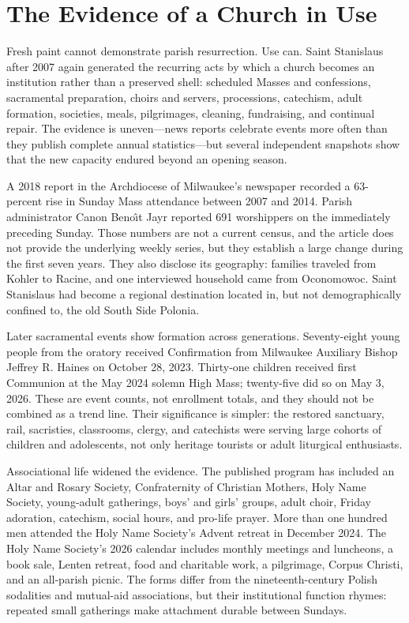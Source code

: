\section{The Evidence of a Church in Use}

Fresh paint cannot demonstrate parish resurrection. Use can. Saint Stanislaus after 2007 again generated the recurring acts by which a church becomes an institution rather than a preserved shell: scheduled Masses and confessions, sacramental preparation, choirs and servers, processions, catechism, adult formation, societies, meals, pilgrimages, cleaning, fundraising, and continual repair. The evidence is uneven---news reports celebrate events more often than they publish complete annual statistics---but several independent snapshots show that the new capacity endured beyond an opening season.

A 2018 report in the Archdiocese of Milwaukee's newspaper recorded a 63-percent rise in Sunday Mass attendance between 2007 and 2014. Parish administrator Canon Beno\^{\i}t Jayr reported 691 worshippers on the immediately preceding Sunday. Those numbers are not a current census, and the article does not provide the underlying weekly series, but they establish a large change during the first seven years. They also disclose its geography: families traveled from Kohler to Racine, and one interviewed household came from Oconomowoc. Saint Stanislaus had become a regional destination located in, but not demographically confined to, the old South Side Polonia.

Later sacramental events show formation across generations. Seventy-eight young people from the oratory received Confirmation from Milwaukee Auxiliary Bishop Jeffrey R. Haines on October 28, 2023. Thirty-one children received first Communion at the May 2024 solemn High Mass; twenty-five did so on May 3, 2026. These are event counts, not enrollment totals, and they should not be combined as a trend line. Their significance is simpler: the restored sanctuary, rail, sacristies, classrooms, clergy, and catechists were serving large cohorts of children and adolescents, not only heritage tourists or adult liturgical enthusiasts.

Associational life widened the evidence. The published program has included an Altar and Rosary Society, Confraternity of Christian Mothers, Holy Name Society, young-adult gatherings, boys' and girls' groups, adult choir, Friday adoration, catechism, social hours, and pro-life prayer. More than one hundred men attended the Holy Name Society's Advent retreat in December 2024. The Holy Name Society's 2026 calendar includes monthly meetings and luncheons, a book sale, Lenten retreat, food and charitable work, a pilgrimage, Corpus Christi, and an all-parish picnic. The forms differ from the nineteenth-century Polish sodalities and mutual-aid associations, but their institutional function rhymes: repeated small gatherings make attachment durable between Sundays.

